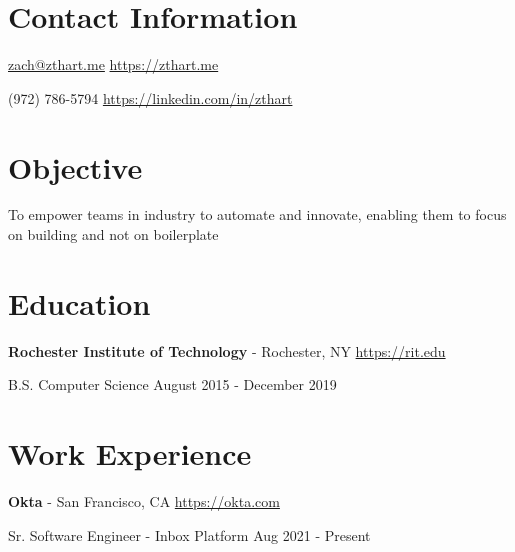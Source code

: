 \documentclass[margin,line]{resume}
\newcommand{\rurl}[1]{\hfill {\footnotesize \url{#1}}}
\newcommand{\rdate}[1]{\hfill {\small #1}}
\begin{document}

\begin{resume}
\section{\mysidestyle Contact Information}
	\begin{asparablank}
		\item \href{mailto:zach@zthart.me}{zach@zthart.me} \rurl{https://zthart.me}
		\item (972) 786-5794 \rurl{https://linkedin.com/in/zthart}
    	\end{asparablank}

\section{\mysidestyle Objective}
	\begin{asparablank}
	\item To empower teams in industry to automate and innovate, enabling them to focus on building and not on boilerplate
        \normalsize
	\end{asparablank}

\section{\mysidestyle Education}
	\begin{asparablank}
	\item{\bf Rochester Institute of Technology} - Rochester, NY \rurl{https://rit.edu}
		\small \item B.S. Computer Science \rdate{August 2015 - December 2019}
	\end{asparablank}

\section{\mysidestyle Work Experience}
	\begin{asparablank}

    \item{\bf Okta} - San Francisco, CA \rurl{https://okta.com}
    \small \item Sr. Software Engineer - Inbox Platform \rdate{Aug 2021 - Present} \\


\end{asparablank}
\end{resume}
\end{document}

